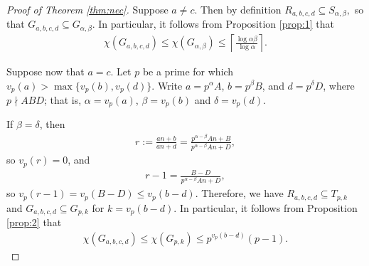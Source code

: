 \documentclass[12pt, reqno, a4paper]{amsart}
\theoremstyle{definition}
\theoremstyle{remark}
\numberwithin{equation}{section}
\renewcommand{\leq}{\leqslant}
\begin{document}
\begin{proof}[Proof of Theorem \ref{thm:nec}]
Suppose \( a \ne c \). Then by definition $R_{a,b,c,d} \subseteq S_{\alpha,\beta},$ so that $G_{a,b,c,d} \subseteq G_{\alpha,\beta}.$ In particular, it follows from Proposition \ref{prop:1} that
\begin{align*}
\chi(G_{a,b,c,d}) \leq \chi(G_{\alpha,\beta}) \leq \left\lceil \frac{\log \alpha\beta}{\log \alpha} \right\rceil.
\end{align*}

Suppose now that \( a = c \). Let $p$ be a prime for which $v_p(a)>\max\{ v_p(b), v_p(d)\}.$ Write \( a = p^\alpha A \), \( b = p^\beta B \), and \( d = p^\delta D \), where \( p \nmid ABD \); that is, \( \alpha = v_p(a) \), \( \beta = v_p(b) \) and \( \delta = v_p(d) \). 


If \( \beta = \delta \), then 
\begin{align*}
r := \frac{an + b}{an + d} 
= \frac{p^{\alpha - \beta} A n + B}{p^{\alpha - \beta} A n + D},
\end{align*}
so \( v_p(r) = 0 \), and
\begin{align*}
r - 1 = \frac{B - D}{p^{\alpha - \beta} A n + D},
\end{align*}
so \( v_p(r - 1) = v_p(B - D) \leq v_p(b - d) \).
 Therefore, we have
 $R_{a,b,c,d} \subseteq T_{p,k}$ and  $G_{a,b,c,d} \subseteq G_{p,k}$ for $k=v_p(b-d).$ In particular, it follows from Proposition \ref{prop:2} that
\begin{align*}
\chi(G_{a,b,c,d}) \leq \chi(G_{p,k}) \leq p^{v_p(b - d)}(p - 1).
\end{align*}



\end{proof}
\end{document}
